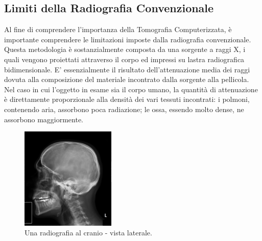 \documentclass[a4paper,11pt, oneside]{article}
\begin{document}

                
               
            \subsection{Limiti della Radiografia Convenzionale}
                \par
                    Al fine di comprendere l'importanza della Tomografia Computerizzata, è importante comprendere le limitazioni imposte dalla radiografia convenzionale. Questa metodologia è sostanzialmente composta da una sorgente a raggi X, i quali vengono proiettati attraverso il corpo ed impressi su lastra radiografica bidimensionale. E’ essenzialmente il risultato dell’attenuazione media\cite{hounsfield-nobel-lecture} dei raggi dovuta alla composizione del materiale incontrato dalla sorgente alla pellicola. Nel caso in cui l’oggetto in esame sia il corpo umano, la quantità di attenuazione è direttamente proporzionale alla densità dei vari tessuti incontrati: i polmoni, contenendo aria, assorbono poca radiazione; le ossa, essendo molto dense, ne assorbono maggiormente.
                            
                    \begin{figure}[h]
                        \centering
                        \includegraphics[width=0.4\textwidth]{radiografia}
                        \caption{Una radiografia al cranio - vista laterale.}
                        \label{fig:skull}
                    \end{figure}
                        
\end{document}
